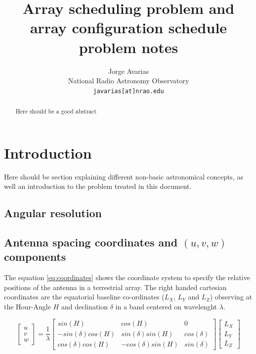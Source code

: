 \documentclass[11pt]{article}
\begin{document}
\title{Array scheduling problem and array configuration schedule problem notes}
\author{Jorge Avarias \\
National Radio Astronomy Observatory\\
\texttt{javarias[at]nrao.edu}}
\maketitle

\begin{abstract}
Here should be a good abstract
\end{abstract}

\section{Introduction}
\label{sec:astro-concepts}
Here should be section explaining different non-basic astronomical concepts, as well an introduction to the problem treated in this document.

\subsection{Angular resolution}
\label{sec:angular-res}

\subsection{Antenna spacing coordinates and $(u,v,w)$ components}
\label{sec:uvcover}
The equation \ref{eq:coordinates} shows the coordinate system to specify the relative positions of the antenna in a terrestrial array. The right handed cartesian coordinates are the equatorial baseline co-ordinates ($L_X$, $L_Y$ and $L_Z$) observing at the Hour-Angle $H$ and declination $\delta$ in a band centered on wavelenght $\lambda$. 

\begin{equation}\label{eq:coordinates}
\begin{bmatrix}
u\\
v\\
w
\end{bmatrix}
=\frac{1}{\lambda}
\begin{bmatrix}
sin(H) & cos(H) & 0\\
-sin(\delta)cos(H) & sin(\delta)sin(H) & cos(\delta)\\
cos(\delta)cos(H) & -cos(\delta)sin(H) & sin(\delta)
\end{bmatrix}
\begin{bmatrix}
L_{X}\\
L_{Y}\\
L_{Z}
\end{bmatrix}
\end{equation}
\end{document}
